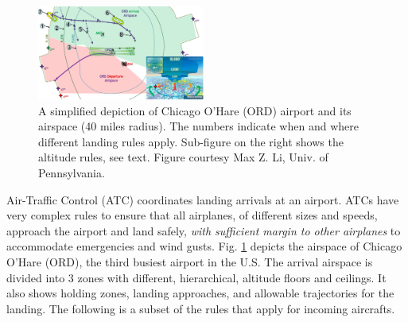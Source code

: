 \begin{figure}[t]
\centering
\includegraphics[width=0.49\textwidth]{figures/ATC_Example}
\caption{{\small A simplified depiction of Chicago O'Hare (ORD) airport and its airspace (40 miles radius). The numbers indicate when and where different landing rules apply. Sub-figure on the right shows the altitude rules, see text. Figure courtesy Max Z. Li, Univ. of Pennsylvania.}} 
\label{fig:atc_example}
\end{figure}

\begin{exmp}
Air-Traffic Control (ATC) coordinates landing arrivals at an airport. 
ATCs have very complex rules to ensure that all airplanes, of different sizes and speeds, approach the airport and land safely, \textit{with sufficient margin to other airplanes} to accommodate emergencies and wind gusts.
Fig. \ref{fig:atc_example} depicts the airspace of Chicago O'Hare (ORD), the third busiest airport in the U.S.
The arrival airspace is divided into 3 zones with different, hierarchical, altitude floors and ceilings. 
It also shows holding zones, landing approaches, and allowable trajectories for the landing. 
The following is a subset of the rules that apply for incoming aircrafts.
\end{exmp}

